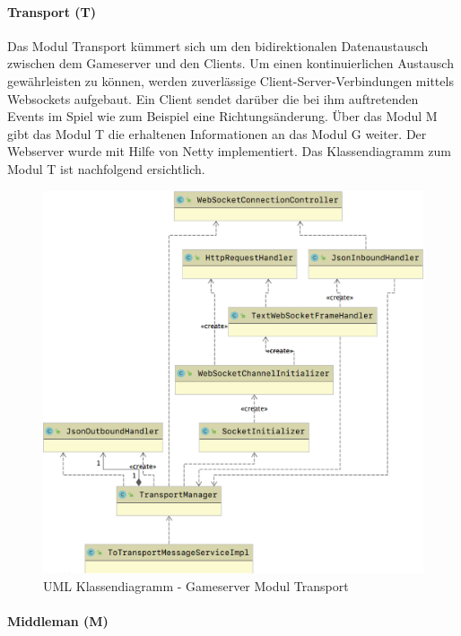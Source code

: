 \documentclass[11pt,ngerman]{article}
\begin{document}
    \paragraph{Transport (T)}

	Das Modul Transport kümmert sich um den bidirektionalen Datenaustausch zwischen dem Gameserver und den Clients. Um einen kontinuierlichen Austausch gewährleisten zu können, werden zuverlässige Client-Server-Verbindungen mittels \Gls{Websocket}s aufgebaut. Ein Client sendet darüber die bei ihm auftretenden Events im Spiel wie zum Beispiel eine Richtungsänderung. Über das Modul M gibt das Modul T die erhaltenen Informationen an das Modul G weiter. Der Webserver wurde mit Hilfe von \Gls{Netty} implementiert. Das Klassendiagramm zum Modul T ist nachfolgend ersichtlich.

	\begin{figure}[H]
    	\centering
    	\includegraphics[scale=0.3]{figures/gameserver-uml/transport-classes.png}
    	\caption{UML Klassendiagramm - Gameserver Modul Transport}
    	\label{fig:UMLModulTransport}
    \end{figure}

	\paragraph{Middleman (M)}
\end{document}
